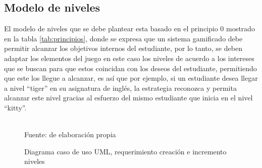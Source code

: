 \subsection{Modelo de niveles}

El modelo de niveles que se debe plantear esta basado en el principio 0 mostrado en la tabla 
\ref{tab:principios}, donde se expresa que un sistema gamificado debe permitir alcanzar los objetivos internos 
del estudiante, por lo tanto, se deben adaptar los elementos del juego en este caso los niveles de acuerdo a 
los intereses que se buscan para que estos coincidan con los deseos del estudiante, permitiendo que este los 
llegue a alcanzar, es así que por ejemplo, si un estudiante desea llegar a nivel ``tiger'' en su asignatura de 
inglés, la estrategia reconozca y permita alcanzar este nivel gracias al esfuerzo del mismo estudiante que 
inicia en el nivel ``kitty''.

\begin{figure}[!htb]
\caption{Diagrama caso de uso UML, requerimiento creación e incremento niveles}
\label{img:UMLcreacioncartas}
\centering
\begin{adjustbox}{width=15cm}
\end{adjustbox}
\\
{\footnotesize Fuente: de elaboración propia}
\end{figure}

